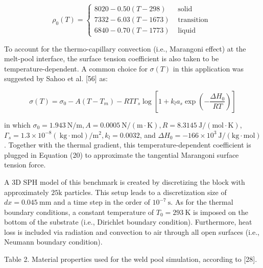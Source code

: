 \documentclass[10pt]{article}
\begin{document}
\[
\rho_{0}(T)= \begin{cases}8020-0.50(T-298) & \text { solid }  \tag{25}\\ 7332-6.03(T-1673) & \text { transition } \\ 6840-0.70(T-1773) & \text { liquid }\end{cases}
\]

To account for the thermo-capillary convection (i.e., Marangoni effect) at the melt-pool interface, the surface tension coefficient is also taken to be temperature-dependent. A common choice for $\sigma(T)$ in this application was suggested by Sahoo et al. [56] as:


\begin{equation*}
\sigma(T)=\sigma_{0}-A\left(T-T_{m}\right)-R T \Gamma_{s} \log \left[1+k_{l} a_{s} \exp \left(-\frac{\Delta H_{0}}{R T}\right)\right] \tag{26}
\end{equation*}


in which $\sigma_{0}=1.943 \mathrm{~N} / \mathrm{m}, A=0.0005 \mathrm{~N} /(\mathrm{m} \cdot \mathrm{K}), R=8.3145 \mathrm{~J} /(\mathrm{mol} \cdot \mathrm{K})$, $\Gamma_{s}=1.3 \times 10^{-8}(\mathrm{~kg} \cdot \mathrm{mol}) / \mathrm{m}^{2}, k_{l}=0.0032$, and $\Delta H_{0}=-166 \times 10^{3} \mathrm{~J} /(\mathrm{kg} \cdot \mathrm{mol})$. Together with the thermal gradient, this temperature-dependent coefficient is plugged in Equation (20) to approximate the tangential Marangoni surface tension force.

A 3D SPH model of this benchmark is created by discretizing the block with approximately $25 \mathrm{k}$ particles. This setup leads to a discretization size of $d x=0.045 \mathrm{~mm}$ and a time step in the order of $10^{-7} \mathrm{~s}$. As for the thermal boundary conditions, a constant temperature of $T_{0}=293 \mathrm{~K}$ is imposed on the bottom of the substrate (i.e., Dirichlet boundary condition). Furthermore, heat loss is included via radiation and convection to air through all open surfaces (i.e., Neumann boundary condition).

Table 2. Material properties used for the weld pool simulation, according to [28].
\end{document}
